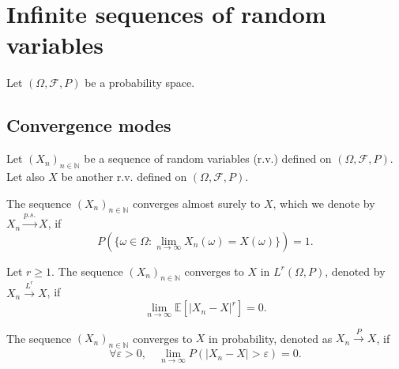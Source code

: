 \chapter{Infinite sequences of random variables}%
\sloppy
Let $(\Omega, \mathcal{F}, P)$ be a probability space.%
\section{Convergence modes}%
Let $(X_n)_{n \in \mathbb{N}}$ be a sequence of random variables (r.v.) defined on $(\Omega, \mathcal{F}, P)$. Let also $X$ be another r.v. defined on $(\Omega, \mathcal{F}, P)$.%

\begin{definition}
The sequence $(X_n)_{n \in \mathbb{N}}$ converges almost surely to $X$, which we denote by $X_n \xrightarrow{p.s.} X$, if
\[
P(\{\omega \in \Omega : \lim_{n \to \infty} X_n(\omega) = X(\omega)\}) = 1.
\]
\end{definition}
\begin{definition}
Let $r \geq 1$. The sequence $(X_n)_{n \in \mathbb{N}}$ converges to $X$ in $L^r(\Omega, P)$, denoted by $X_n \xrightarrow{L^r} X$, if
\[
\lim_{n \to \infty} \mathbb{E}[|X_n - X|^r] = 0.
\]
\end{definition}%
\begin{definition}
The sequence $(X_n)_{n \in \mathbb{N}}$ converges to $X$ in probability, denoted as $X_n \xrightarrow{P} X$, if
\[
\forall \varepsilon > 0, \quad \lim_{n \to \infty} P(|X_n - X| > \varepsilon) = 0.
\]
\end{definition}%
